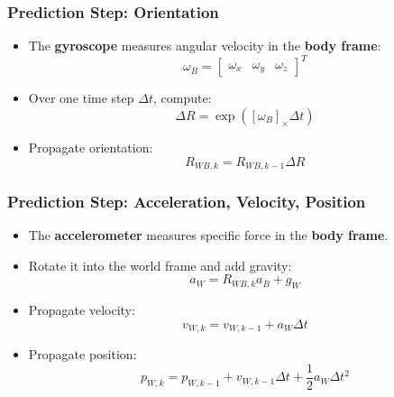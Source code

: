 \documentclass[aspectratio=169]{beamer}
\begin{document}
\begin{frame}
	\frametitle{Prediction Step: Orientation}
	
	\begin{itemize}
		\item The \textbf{gyroscope} measures angular velocity in the \textbf{body frame}:
		\[
		\omega_B =
		\begin{bmatrix}
			\omega_x & \omega_y & \omega_z
		\end{bmatrix}^T
		\]
		
		\item Over one time step $\Delta t$, compute:
		\[
		\Delta R = \exp([\omega_B]_\times \Delta t)
		\]
		
		\item Propagate orientation:
		\[
		R_{WB,k} = R_{WB,k-1}\Delta R
		\]
	\end{itemize}
	
\end{frame}


\begin{frame}
	\frametitle{Prediction Step: Acceleration, Velocity, Position}
	
	\begin{itemize}
		\item The \textbf{accelerometer} measures specific force in the \textbf{body frame}.
		\item Rotate it into the world frame and add gravity:
		\[
		a_W = R_{WB,k}a_B + g_W
		\]
		
		\item Propagate velocity:
		\[
		v_{W,k} = v_{W,k-1} + a_W\Delta t
		\]
		
		\item Propagate position:
		\[
		p_{W,k} =
		p_{W,k-1}
		+ v_{W,k-1}\Delta t
		+ \frac{1}{2}a_W\Delta t^2
		\]
		
	\end{itemize}
	
\end{frame}
\end{document}
